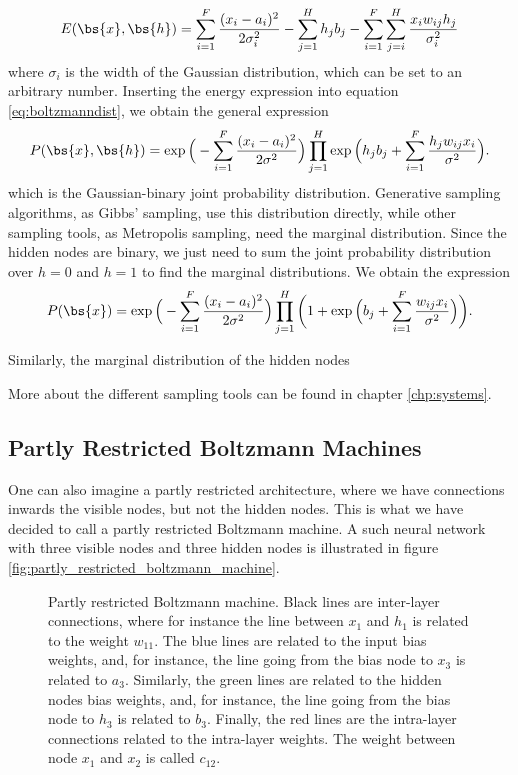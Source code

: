 \begin{equation}
E(\bs{x},\bs{h})= \sum_{i=1}^F\frac{(x_i-a_i)^2}{2\sigma_i^2} - \sum_{j=1}^Hh_jb_j-\sum_{i=1}^F\sum_{j=i}^H \frac{x_iw_{ij}h_j}{\sigma_i^2} 
\label{eq:gaussianbinary}
\end{equation}
where $\sigma_i$ is the width of the Gaussian distribution, which can be set to an arbitrary number. Inserting the energy expression into equation \eqref{eq:boltzmanndist}, we obtain the general expression 
\begin{equation}
P(\bs{x},\bs{h})=\exp\Big(-\sum_{i=1}^F\frac{(x_i-a_i)^2}{2\sigma^2}\Big)\prod_{j=1}^H\exp\Big(h_jb_j+\sum_{i=1}^F\frac{h_jw_{ij}x_i}{\sigma^2}\Big).
\label{eq:RBMWF1}
\end{equation}
which is the Gaussian-binary joint probability distribution. Generative sampling algorithms, as Gibbs' sampling, use this distribution directly, while other sampling tools, as Metropolis sampling, need the marginal distribution. Since the hidden nodes are binary, we just need to sum the joint probability distribution over $h=0$ and $h=1$ to find the marginal distributions. We obtain the expression
\begin{equation}
P(\bs{x})=\exp\Big(-\sum_{i=1}^F\frac{(x_i-a_i)^2}{2\sigma^2}\Big)\prod_{j=1}^H\bigg(1+\exp\Big(b_j+\sum_{i=1}^F\frac{w_{ij}x_i}{\sigma^2}\Big)\bigg).
\label{eq:RBMWF2}
\end{equation}

Similarly, the marginal distribution of the hidden nodes 

More about the different sampling tools can be found in chapter \ref{chp:systems}.

\subsection{Partly Restricted Boltzmann Machines}
One can also imagine a partly restricted architecture, where we have connections inwards the visible nodes, but not the hidden nodes. This is what we have decided to call a partly restricted Boltzmann machine. A such neural network with three visible nodes and three hidden nodes is illustrated in figure \eqref{fig:partly_restricted_boltzmann_machine}.

\begin{figure} [H]
	\centering
	
	\caption{Partly restricted Boltzmann machine. Black lines are inter-layer connections, where for instance the line between $x_1$ and $h_1$ is related to the weight $w_{11}$. The blue lines are related to the input bias weights, and, for instance, the line going from the bias node to $x_3$ is related to $a_3$. Similarly, the green lines are related to the hidden nodes bias weights, and, for instance, the line going from the bias node to $h_3$ is related to $b_3$. Finally, the red lines are the intra-layer connections related to the intra-layer weights. The weight between node $x_1$ and $x_2$ is called $c_{12}$. }
	\label{fig:partly_restricted_boltzmann_machine}
\end{figure}

